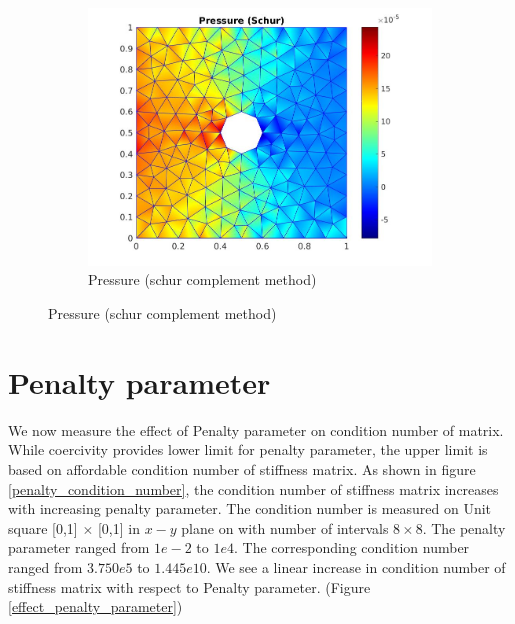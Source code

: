 \documentclass[a4paper]{book}
\begin{document}
\begin{figure}[H]
\begin{subfigure}{\textwidth}
  \includegraphics[width=\linewidth]{cylinder_schur_pressure.jpg}
  \caption{Pressure (schur complement method)}
  \label{pressure_stoke_schur}
\end{subfigure}
\label{flow_over_cylinder_schur}
\end{figure}

\section{Penalty parameter}

We now measure the effect of Penalty parameter on condition number of matrix. While coercivity provides lower limit for penalty parameter, the upper limit is based on affordable condition number of stiffness matrix. As shown in figure \ref{penalty_condition_number}, the condition number of stiffness matrix increases with increasing penalty parameter.
The condition number is measured on Unit square [0,1] $\times$ [0,1] in $x-y$ plane on with number of intervals $8 \times 8$. The penalty parameter ranged from $1e-2$ to $1e4$. The corresponding condition number ranged from $3.750e5$ to $1.445e10$. We see a linear increase in condition number of stiffness matrix with respect to Penalty parameter. (Figure \ref{effect_penalty_parameter})
\end{document}
